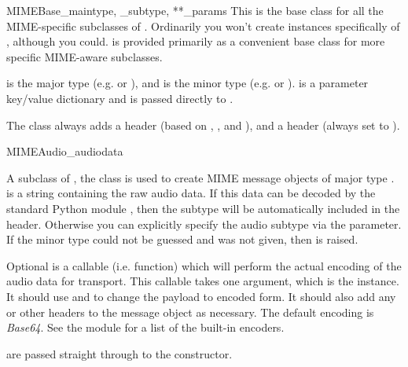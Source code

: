 \begin{classdesc}{MIMEBase}{_maintype, _subtype, **_params}
This is the base class for all the MIME-specific subclasses of
.  Ordinarily you won't create instances specifically
of , although you could.   is provided
primarily as a convenient base class for more specific MIME-aware
subclasses.

 is the  major type
(e.g.  or ), and  is the
 minor type 
(e.g.  or ).   is a parameter
key/value dictionary and is passed directly to
.

The  class always adds a  header
(based on , , and ), and a
 header (always set to ).
\end{classdesc}

\begin{classdesc}{MIMEAudio}{_audiodata}

A subclass of , the  class is used to
create MIME message objects of major type .
 is a string containing the raw audio data.  If this
data can be decoded by the standard Python module ,
then the subtype will be automatically included in the
 header.  Otherwise you can explicitly specify the
audio subtype via the  parameter.  If the minor type could
not be guessed and  was not given, then 
is raised.

Optional  is a callable (i.e. function) which will
perform the actual encoding of the audio data for transport.  This
callable takes one argument, which is the  instance.
It should use  and  to
change the payload to encoded form.  It should also add any
 or other headers to the message
object as necessary.  The default encoding is \emph{Base64}.  See the
 module for a list of the built-in encoders.

 are passed straight through to the 
constructor.
\end{classdesc}

